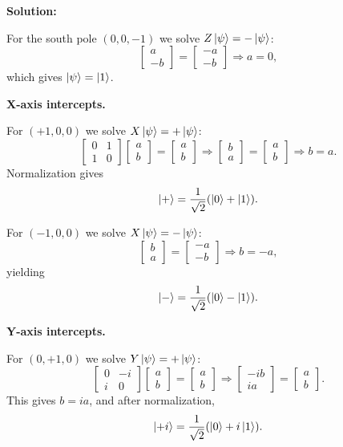 \documentclass[11pt]{article}
\newenvironment{solution}
{\par\noindent\textbf{Solution:}\par}
{\vspace{1em}}
\begin{document}
\begin{solution}
For the south pole $(0,0,-1)$ we solve $Z\ket{\psi}=-\ket{\psi}$:
\[
\begin{bmatrix}a\\ -b\end{bmatrix}
=
\begin{bmatrix}-a\\ -b\end{bmatrix}
\Rightarrow a=0,
\]
which gives $\ket{\psi}=\ket{1}$.

\textbf{X-axis intercepts.}

For $(+1,0,0)$ we solve $X\ket{\psi}=+\ket{\psi}$:
\[
\begin{bmatrix}0&1\\1&0\end{bmatrix}
\begin{bmatrix}a\\ b\end{bmatrix}
=
\begin{bmatrix}a\\ b\end{bmatrix}
\Rightarrow
\begin{bmatrix}b\\ a\end{bmatrix}
=
\begin{bmatrix}a\\ b\end{bmatrix}
\Rightarrow b=a.
\]
Normalization gives
\[
\ket{+}=\frac{1}{\sqrt2}(\ket{0}+\ket{1}).
\]

For $(-1,0,0)$ we solve $X\ket{\psi}=-\ket{\psi}$:
\[
\begin{bmatrix}b\\ a\end{bmatrix}
=
\begin{bmatrix}-a\\ -b\end{bmatrix}
\Rightarrow b=-a,
\]
yielding
\[
\ket{-}=\frac{1}{\sqrt2}(\ket{0}-\ket{1}).
\]

\textbf{Y-axis intercepts.}

For $(0,+1,0)$ we solve $Y\ket{\psi}=+\ket{\psi}$:
\[
\begin{bmatrix}0&-i\\ i&0\end{bmatrix}
\begin{bmatrix}a\\ b\end{bmatrix}
=
\begin{bmatrix}a\\ b\end{bmatrix}
\Rightarrow
\begin{bmatrix}-ib\\ ia\end{bmatrix}
=
\begin{bmatrix}a\\ b\end{bmatrix}.
\]
This gives $b=ia$, and after normalization,
\[
\ket{+i}=\frac{1}{\sqrt2}(\ket{0}+i\ket{1}).
\]


\end{solution}
\end{document}
